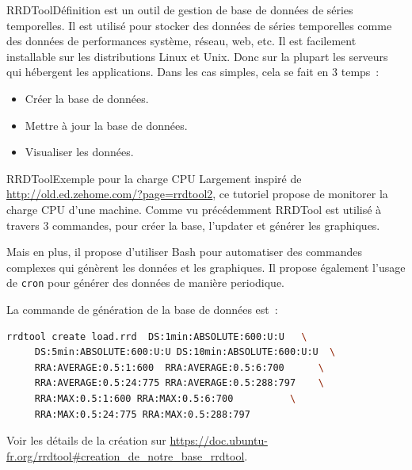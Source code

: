 \documentclass{beamer}
\begin{document}
    \begin{frame}{RRDTool}{Définition}
         est un outil de gestion de base de données de séries temporelles.
        \bigbreak
        Il est utilisé pour stocker des données de séries temporelles comme des données de performances système, réseau, web, etc.
        \bigbreak
        Il est facilement installable sur les distributions Linux et Unix.
        Donc sur la plupart les serveurs qui hébergent les applications.
        \bigbreak
        Dans les cas simples, cela se fait en 3 temps~:
        \begin{itemize}
            \item Créer la base de données.
            \item Mettre à jour la base de données.
            \item Visualiser les données.
        \end{itemize}
    \end{frame}

    \begin{frame}[fragile]{RRDTool}{Exemple pour la charge CPU}
        Largement inspiré de \url{http://old.ed.zehome.com/?page=rrdtool2}, ce tutoriel propose de monitorer la charge CPU d'une machine.
        \bigbreak
        Comme vu précédemment RRDTool est utilisé à travers 3 commandes, pour créer la base, l'updater et générer les graphiques.

        Mais en plus, il propose d'utiliser Bash pour automatiser des commandes complexes qui génèrent les données et les graphiques.
        Il propose également l'usage de \lstinline{cron} pour générer des données de manière periodique.

        La commande de génération de la base de données est~:
        \begin{lstlisting}[language=bash,basicstyle=\ttfamily\tiny]
rrdtool create load.rrd  DS:1min:ABSOLUTE:600:U:U   \
     DS:5min:ABSOLUTE:600:U:U DS:10min:ABSOLUTE:600:U:U  \
     RRA:AVERAGE:0.5:1:600  RRA:AVERAGE:0.5:6:700      \
     RRA:AVERAGE:0.5:24:775 RRA:AVERAGE:0.5:288:797    \
     RRA:MAX:0.5:1:600 RRA:MAX:0.5:6:700          \
     RRA:MAX:0.5:24:775 RRA:MAX:0.5:288:797
        \end{lstlisting}
        Voir les détails de la création sur \url{https://doc.ubuntu-fr.org/rrdtool#creation_de_notre_base_rrdtool}.
    \end{frame}
\end{document}
